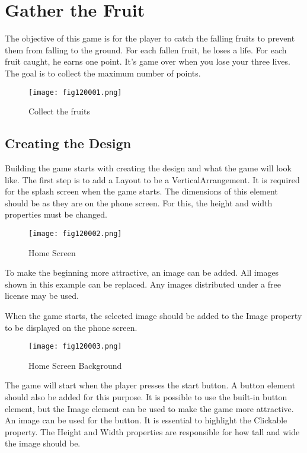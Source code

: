 \chapter{Gather the Fruit}

The objective of this game is for the player to catch the falling fruits to prevent them from falling to the ground. For each fallen fruit, he loses a life. For each fruit caught, he earns one point. It's game over when you lose your three lives. The goal is to collect the maximum number of points.

\begin{figure}[H]
   \centering
   \texttt{[image: fig120001.png]}
   \caption{Collect the fruits}
\label{fig120001}
\end{figure}

\section{Creating the Design}
Building the game starts with creating the design and what the game will look like. The first step is to add a Layout to be a VerticalArrangement. It is required for the splash screen when the game starts. The dimensions of this element should be as they are on the phone screen. For this, the height and width properties must be changed.

\begin{figure}[H]
   \centering
   \texttt{[image: fig120002.png]}
   \caption{Home Screen}
\label{fig120002}
\end{figure}

To make the beginning more attractive, an image can be added. All images shown in this example can be replaced. Any images distributed under a free license may be used.

When the game starts, the selected image should be added to the Image property to be displayed on the phone screen.

\begin{figure}[H]
   \centering
   \texttt{[image: fig120003.png]}
   \caption{Home Screen Background}
\label{fig120003}
\end{figure}

The game will start when the player presses the start button. A button element should also be added for this purpose. It is possible to use the built-in button element, but the Image element can be used to make the game more attractive. An image can be used for the button. It is essential to highlight the Clickable property. The Height and Width properties are responsible for how tall and wide the image should be.

